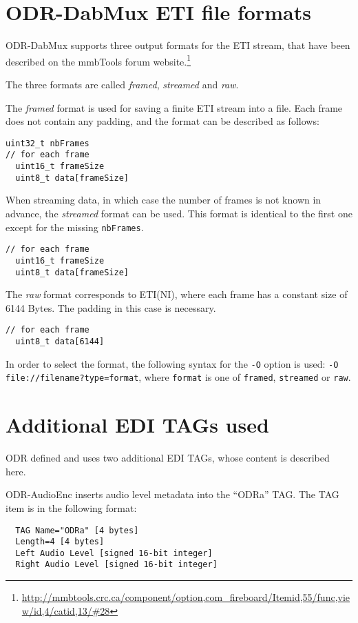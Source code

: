 
\section{ODR-DabMux ETI file formats}
\label{etiformat}
ODR-DabMux supports three output formats for the ETI stream, that have been described on the mmbTools forum
website.\footnote{\url{http://mmbtools.crc.ca/component/option,com\_fireboard/Itemid,55/func,view/id,4/catid,13/\#28}}

The three formats are called \emph{framed}, \emph{streamed} and \emph{raw}.

The \emph{framed} format is used for saving a finite ETI stream into a file. Each frame does not contain any padding, and the
format can be described as follows:
\begin{lstlisting}
uint32_t nbFrames
// for each frame
  uint16_t frameSize
  uint8_t data[frameSize]
\end{lstlisting}

When streaming data, in which case the number of frames is not known in advance, the \emph{streamed} format can be used.
This format is identical to the first one except for the missing \texttt{nbFrames}.
\begin{lstlisting}
// for each frame
  uint16_t frameSize
  uint8_t data[frameSize]
\end{lstlisting}

The \emph{raw} format corresponds to ETI(NI), where each frame has a constant size of 6144 Bytes. The padding in this
case is necessary.
\begin{lstlisting}
// for each frame
  uint8_t data[6144]
\end{lstlisting}

In order to select the format, the following syntax for the \texttt{-O} option is used:
\texttt{-O file://filename?type=format}, where \texttt{format} is one of \verb+framed+, \verb+streamed+ or
\verb+raw+.


\section{Additional EDI TAGs used}
ODR defined and uses two additional EDI TAGs, whose content is described here.

ODR-AudioEnc inserts audio level metadata into the ``ODRa'' TAG. The TAG item is in the following format:
\begin{lstlisting}
  TAG Name="ODRa" [4 bytes]
  Length=4 [4 bytes]
  Left Audio Level [signed 16-bit integer]
  Right Audio Level [signed 16-bit integer]
\end{lstlisting}


